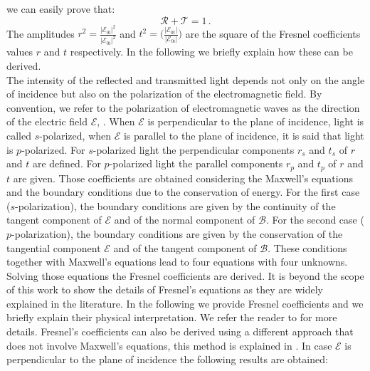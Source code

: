 we can easily prove that:
\begin{equation}
\mathcal{R}+\mathcal{T}=1\,.
\end{equation}
The amplitudes $r^2 = \frac{|\boldsymbol{\mathcal{E}}_{0 \textrm{i}}|^2}{|\boldsymbol{\mathcal{E}}_{0 \textrm{i}}|^2}$ and $t^2 = \Big(\frac{|\boldsymbol{\mathcal{E}}_{0 \textrm{t}}|}{|\boldsymbol{\mathcal{E}}_{0 \textrm{i}}|}\Big)$ are the square of the Fresnel coefficients values $r$ and $t$ respectively. In the following we briefly explain how these can be derived. \\ \indent 
The intensity of the reflected and transmitted light depends not only on the angle of incidence but also on the polarization of the electromagnetic field.
By convention, we refer to the polarization of electromagnetic waves as the direction of the electric field $\boldsymbol{\mathcal{E}}$, 
\cite{feynman1964feynman}. When $\boldsymbol{\mathcal{E}}$ is perpendicular to the plane of incidence, light is called $s$-polarized, when
$\boldsymbol{\mathcal{E}}$ is parallel to the plane of incidence, it is said that light is $p$-polarized.
For $s$-polarized light the perpendicular components $r_s$ and $t_s$ of $r$ and $t$ are defined. 
For $p$-polarized light the parallel components $r_p$ and $t_p$ of $r$ and $t$ are given. 
Those coefficients are obtained considering the Maxwell's equations and the boundary conditions due to the conservation of energy.
For the first case ($s$-polarization), the boundary conditions are given by the continuity of the tangent component of $\boldsymbol{\mathcal{E}}$ and of the normal component of $\boldsymbol{\mathcal{B}}$. For the second case ($p$-polarization), the boundary conditions are given by the conservation of the tangential component $\boldsymbol{\mathcal{E}}$ and of the tangent component of $\boldsymbol{\mathcal{B}}$. These conditions together with Maxwell's equations lead to four equations with four unknowns.
Solving those equations the Fresnel coefficients are derived. 
It is beyond the scope of this work to show the details of Fresnel's equations as they are widely explained in the literature. 
In the following we provide Fresnel coefficients and we briefly explain their physical interpretation. We refer the reader to \cite{born2013principles, hecht1998hecht} for more details. 
Fresnel's coefficients can also be derived using a different approach that does not involve Maxwell's equations, this method is explained in \cite{feynman2011feynman}. 
In case $\boldsymbol{\mathcal{E}}$ is perpendicular to the plane of incidence the following results are obtained:
